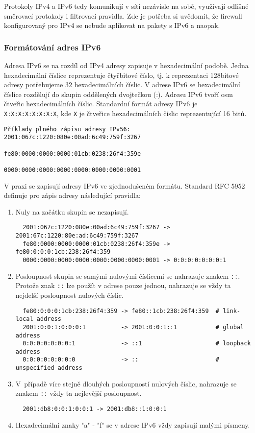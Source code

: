 Protokoly IPv4 a IPv6 tedy komunikují v síti nezávisle na sobě, využívají odlišné směrovací protokoly i filtrovací pravidla. Zde je potřeba si uvědomit, že firewall konfigurovaný pro IPv4 se nebude aplikovat na pakety s IPv6 a naopak. 

\subsubsection{Formátování adres IPv6}
Adresa IPv6 se na rozdíl od IPv4 adresy zapisuje v hexadecimální podobě. Jedna hexadecimální číslice reprezentuje čtyřbitové číslo, tj. k reprezentaci 128bitové adresy potřebujeme 32 hexadecimálních číslic. V adrese IPv6 se hexadecimální číslice rozdělují do skupin oddělených dvojtečkou (:). Adresu IPv6 tvoří osm čtveřic hexadecimálních číslic. Standardní formát adresy IPv6 je {\tt X:X:X:X:X:X:X:X}, kde {\tt X} je čtveřice hexadecimálních číslic reprezentující 16 bitů. 
\begin{verbatim}
Příklady plného zápisu adresy IPv56: 2001:067c:1220:080e:00ad:6c49:759f:3267
                                     fe80:0000:0000:0000:01cb:0238:26f4:359e
                                     0000:0000:0000:0000:0000:0000:0000:0001
\end{verbatim}
V praxi se zapisují adresy IPv6 ve zjednodušeném formátu. Standard RFC 5952 \cite{rfc5952} definuje pro zápis adresy následující pravidla:
\begin{enumerate}
  \item Nuly na začátku skupin se nezapisují. 
\begin{verbatim}
  2001:067c:1220:080e:00ad:6c49:759f:3267 -> 2001:67c:1220:80e:ad:6c49:759f:3267
  fe80:0000:0000:0000:01cb:0238:26f4:359e -> fe80:0:0:0:1cb:238:26f4:359
  0000:0000:0000:0000:0000:0000:0000:0001 -> 0:0:0:0:0:0:0:1
\end{verbatim}
\item Posloupnost skupin se samými nulovými číslicemi se nahrazuje znakem {\tt ::}. Protože znak {\tt ::} lze použít v adrese pouze jednou, nahrazuje se vždy ta nejdelší posloupnost nulových číslic.  
\begin{verbatim}
  fe80:0:0:0:1cb:238:26f4:359 -> fe80::1cb:238:26f4:359  # link-local address
  2001:0:0:1:0:0:0:1          -> 2001:0:0:1::1           # global address
  0:0:0:0:0:0:0:1             -> ::1                     # loopback address   
  0:0:0:0:0:0:0:0             -> ::                      # unspecified address 
\end{verbatim}
  \item V~případě více stejně dlouhých posloupností nulových číslic, nahrazuje se znakem {\tt ::} vždy ta nejlevější posloupnost.
\begin{verbatim}
  2001:db8:0:0:1:0:0:1 -> 2001:db8::1:0:0:1
\end{verbatim}
    \item Hexadecimální znaky "a" - "f" se v adrese IPv6 vždy zapisují malými písmeny.
\end{enumerate}


